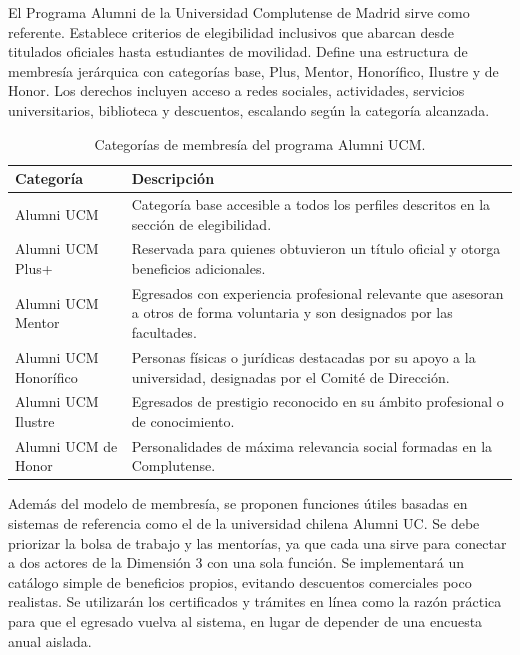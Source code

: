 \documentclass{./plantilla/umss}
\begin{document}
El Programa Alumni de la Universidad Complutense de Madrid sirve como referente. Establece criterios de elegibilidad inclusivos que abarcan desde titulados oficiales hasta estudiantes de movilidad. Define una estructura de membresía jerárquica con categorías base, Plus, Mentor, Honorífico, Ilustre y de Honor. Los derechos incluyen acceso a redes sociales, actividades, servicios universitarios, biblioteca y descuentos, escalando según la categoría alcanzada.

\begin{table}[H]
    \centering
    \begin{tabular}{p{3.5cm}p{9.5cm}}
        \toprule
        \textbf{Categoría} & \textbf{Descripción} \\
        \midrule
        Alumni UCM & Categoría base accesible a todos los perfiles descritos en la sección de elegibilidad. \\
        Alumni UCM Plus+ & Reservada para quienes obtuvieron un título oficial y otorga beneficios adicionales. \\
        Alumni UCM Mentor & Egresados con experiencia profesional relevante que asesoran a otros de forma voluntaria y son designados por las facultades. \\
        Alumni UCM Honorífico & Personas físicas o jurídicas destacadas por su apoyo a la universidad, designadas por el Comité de Dirección. \\
        Alumni UCM Ilustre & Egresados de prestigio reconocido en su ámbito profesional o de conocimiento. \\
        Alumni UCM de Honor & Personalidades de máxima relevancia social formadas en la Complutense. \\
        \bottomrule
    \end{tabular}
    \caption{Categorías de membresía del programa Alumni UCM.}
    \label{tab:categorias-alumni-ucm}
\end{table}

Además del modelo de membresía, se proponen funciones útiles basadas en sistemas de referencia como el de la universidad chilena Alumni UC. Se debe priorizar la bolsa de trabajo y las mentorías, ya que cada una sirve para conectar a dos actores de la Dimensión 3 con una sola función. Se implementará un catálogo simple de beneficios propios, evitando descuentos comerciales poco realistas. Se utilizarán los certificados y trámites en línea como la razón práctica para que el egresado vuelva al sistema, en lugar de depender de una encuesta anual aislada.
\end{document}
